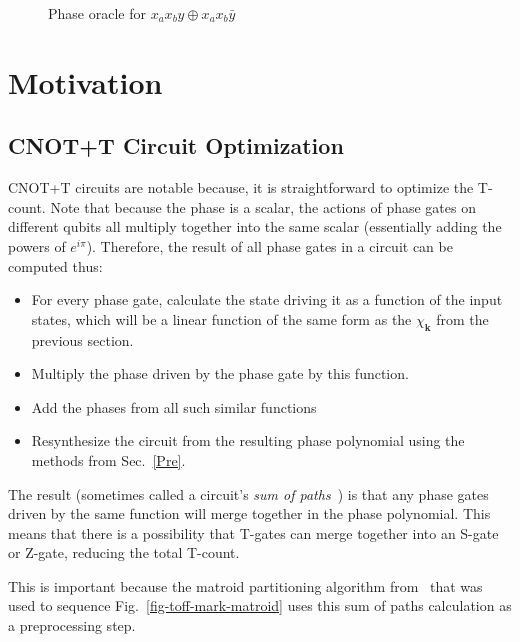 \begin{figure*}
  \centering
  \scalebox{1.0} {
    
  }
  \scalebox{1.0} {
    
  }
  \caption{Phase oracle for $x_a x_b y \oplus x_a x_b \bar{y}$}
  \label{fig-series-all}
\end{figure*}

\section{Motivation}
\label{Mot}
\subsection{CNOT+T Circuit Optimization}
\label{Mot:CnotOpt}
CNOT+T circuits are notable because, it is straightforward to optimize the T-count.
Note that because the phase is a scalar, the actions of phase gates on different
qubits all multiply together into the same scalar (essentially adding the powers
of $e^{i \pi}$). Therefore, the result of all phase gates in a circuit
can be computed thus:

\begin{itemize}
\item For every phase gate, calculate the state driving it as a function of the
  input states, which will be a linear function of the same form as the
  $\chi_{\mathbf{k}}$ from the previous section.
\item Multiply the phase driven by the phase gate by this function.
\item Add the phases from all such similar functions
\item Resynthesize the circuit from the resulting phase polynomial using
  the methods from Sec.~\ref{Pre}.
\end{itemize}

The result (sometimes called a circuit's {\it sum of paths}~\cite{bib-amy-cnot})
is that any phase gates driven by the same function will merge
together in the phase polynomial. This means that there is a possibility that T-gates
can merge together into an S-gate or Z-gate, reducing the total T-count.

This is important because the matroid partitioning algorithm from~\cite{bib-amy-matroid}
that was used to sequence Fig.~\ref{fig-toff-mark-matroid} uses this sum of paths
calculation as a preprocessing step. 

